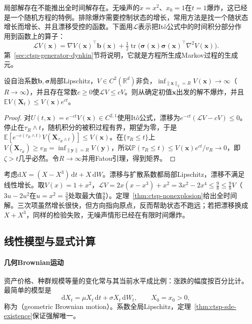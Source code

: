 局部解存在不能推出全时间解存在。无噪声的$\dot x=x^2$、$x_0=1$在$t=1$爆炸，这已经是一个随机方程的特例。排除爆炸需要控制状态的增长，常用方法是找一个随状态增长而增长、并且漂移受控的函数。下面用$\mathcal L$表示把Itô公式中的时间积分部分作用到函数上的算子：
\begin{equation}
  \mathcal LV(\bm x)=\nabla V(\bm x)^\top\bm b(\bm x)+\tfrac12\operatorname{tr}\bigl(\bm\sigma(\bm x)\bm\sigma(\bm x)^\top\nabla^2V(\bm x)\bigr).
  \label{eq:ctsp-diffusion-generator}
\end{equation}
第~\ref{sec:ctsp-generator-dynkin}节将说明，它就是方程所生成Markov过程的生成元。

\begin{theorem}[Lyapunov函数排除爆炸]
  \label{thm:ctsp-nonexplosion}
  设自治系数$\bm b,\bm\sigma$局部Lipschitz，$V\in C^2(\mathbb R^d)$非负，$\inf_{\|\bm x\|_2=R}V(\bm x)\to\infty$（$R\to\infty$），并且存在常数$c\geq0$使$\mathcal LV\leq cV$。则从确定初值$\bm x$出发的解不爆炸，并且$\mathbb EV(\bm X_t)\leq V(\bm x)e^{ct}$。
\end{theorem}

\begin{proof}
对$U(t,\bm x)=e^{-ct}V(\bm x)\in C^{2,1}$使用Itô公式，漂移为$e^{-ct}(\mathcal LV-cV)\leq0$。停止在$\tau_R\wedge t$，随机积分的被积过程有界，期望为零，于是$\mathbb E[e^{-c(\tau_R\wedge t)}V(\bm X_{\tau_R\wedge t})]\leq V(\bm x)$。在$\{\tau_R\leq t\}$上$V(\bm X_{\tau_R})\geq v_R=\inf_{\|\bm y\|=R}V(\bm y)$，所以$\mathbb P(\tau_R\leq t)\leq V(\bm x)e^{ct}/v_R\to0$，即$\zeta>t$几乎必然。令$R\to\infty$并用Fatou引理，得到矩界。
\end{proof}

\begin{example}[内向的超线性漂移]
  \label{ex:ctsp-cubic-nonexplosion}
  考虑$\mathrm dX=(X-X^3)\,\mathrm dt+X\,\mathrm dW$。漂移与扩散系数都局部Lipschitz，漂移不满足线性增长。取$V(x)=1+x^2$，$\mathcal LV=2x(x-x^3)+x^2=3x^2-2x^4\leq\frac98\leq\frac98V$（$3u-2u^2$在$u=x^2=\frac34$处取最大值$\frac98$）。定理~\ref{thm:ctsp-nonexplosion}给出全时间解。三次项虽然增长很快，但方向指向原点，反而帮助状态不跑远；若把漂移换成$X+X^3$，同样的检验失败，无噪声情形已经在有限时间爆炸。
\end{example}

\subsection{线性模型与显式计算}
\label{sec:ctsp-linear-sde}

\paragraph{几何Brownian运动}
资产价格、种群规模等量的变化常与其当前水平成比例：涨跌的幅度按百分比计。最简单的模型是
\begin{equation}
  \mathrm dX_t=\mu X_t\,\mathrm dt+\sigma X_t\,\mathrm dW_t,\qquad X_0=x_0>0 ,
  \label{eq:ctsp-gbm}
\end{equation}
称为（geometric Brownian motion）。系数全局Lipschitz，定理~\ref{thm:ctsp-sde-existence}保证强解唯一。

